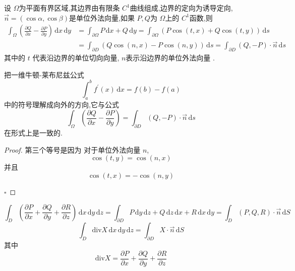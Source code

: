 \documentclass[../../PDE.tex]{subfiles}
\begin{document}
\begin{theorem}
    设 \(   \Omega   \)为平面有界区域,其边界由有限条 \(  C^{1}  \)曲线组成,边界的定向为诱导定向, \(  \vec{n} =  \left( \cos \alpha ,\cos \beta  \right)   \)是单位外法向量,如果 \(  P,Q  \)为 \(   \Omega   \)上的 \(  C^{1}  \)函数,则 \[
   \begin{aligned}
    \int_{ \Omega }\left( \frac{\partial Q}{\partial x} -\frac{\partial P}{\partial y} \right)\,\mathrm{d} x \,\mathrm{d} y &=  \int_{\partial  \Omega }P \,\mathrm{d} x +  Q \,\mathrm{d} y =  \int_{\partial  \Omega } \left( P\cos \left( t,x \right) + Q\cos \left( t,y \right) \right)\,\mathrm{d} s \\ 
     & =  \int_{\partial D} \left(  Q\cos \left( n,x \right)-P\cos \left( n,y \right)   \right)  \,\mathrm{d} s=  \int_{\partial D} \left( Q,-P \right)\cdot \vec{n} \,\mathrm{d} s 
   \end{aligned} 
    \]  其中的 \(  t  \) 代表沿边界的单位切向向量, \(  n  \)表示沿边界的单位外法向量 .    
\end{theorem}

\begin{note}

    把一维牛顿-莱布尼兹公式 \[
    \int_{a}^{b} f^{\prime} \left( x \right)\,\mathrm{d} x =  f\left( b \right)-f\left( a \right)   
    \]中的符号理解成向外的方向,它与公式 \[
    \int_{ \Omega }\left( \frac{\partial Q}{\partial x}-\frac{\partial P}{\partial y} \right)  =  \int_{\partial D} \left( Q,-P \right)\cdot \vec{n}  \,\mathrm{d} s
    \]
在形式上是一致的.
\end{note}

\begin{proof}

    第三个等号是因为
    对于单位外法向量 \(  n  \),
    \[
    \cos \left( t,y \right) =  \cos \left( n,x \right)  
    \]并且 \[
    \cos \left( t,x \right) =  -\cos \left( n,y \right)  
    \]

    \hfill $\square$
\end{proof}

\begin{theorem}
     \[
     \int_{D} \left( \frac{\partial P}{\partial x}+ \frac{\partial Q}{\partial y}+  \frac{\partial R}{\partial z} \right) \,\mathrm{d} x \,\mathrm{d} y \,\mathrm{d} z =  \int_{\partial D} P \,\mathrm{d} y \,\mathrm{d} z +  Q \,\mathrm{d} z \,\mathrm{d}  x +  R \,\mathrm{d} x \,\mathrm{d} y =  \int_{D} \left( P,Q,R \right)\cdot \vec{n} \,\mathrm{d} S  
     \] \[
     \int_{D} \mathrm{div} X \,\mathrm{d} x \,\mathrm{d} y \,\mathrm{d} z =  \int_{\partial D} X \cdot \vec{n} \,\mathrm{d} S
     \]其中 \[
     \mathrm{div}X =  \frac{\partial P}{\partial x}+  \frac{\partial Q}{\partial y}+  \frac{\partial R}{\partial z}
     \]
\end{theorem}
\end{document}
